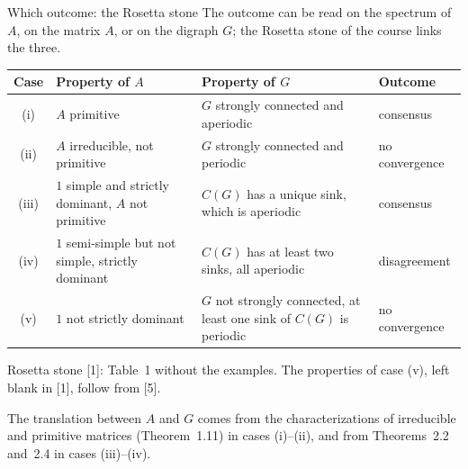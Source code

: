 \documentclass[10pt, aspectratio=169]{beamer}
\begin{document}
\begin{frame}[label=m-fdg-rosetta]{Which outcome: the Rosetta stone}
  \centering
  \footnotesize
  The outcome can be read on the spectrum of $A$, on the matrix $A$, or on the digraph
  $G$; the Rosetta stone of the course links the three.

  \vspace{2mm}
  \renewcommand{\arraystretch}{1.25}
  \begin{tabular}{@{}c >{\raggedright\arraybackslash}p{4.4cm}
                    >{\raggedright\arraybackslash}p{5.2cm} l@{}}
    \toprule
    Case & Property of $A$ & Property of $G$ & Outcome \\
    \midrule
    (i)   & $A$ primitive
          & $G$ strongly connected and aperiodic
          & consensus \\
    (ii)  & $A$ irreducible, not primitive
          & $G$ strongly connected and periodic
          & no convergence \\
    (iii) & $1$ simple and strictly dominant, $A$ not primitive
          & $C(G)$ has a unique sink, which is aperiodic
          & consensus \\
    (iv)  & $1$ semi-simple but not simple, strictly dominant
          & $C(G)$ has at least two sinks, all aperiodic
          & disagreement \\
    (v)   & $1$ not strictly dominant
          & $G$ not strongly connected, at least one sink of $C(G)$ is periodic
          & no convergence \\
    \bottomrule
  \end{tabular}

  \vspace{1mm}
  {\scriptsize Rosetta stone [1]: Table~1 without the examples. The properties of case
  (v), left blank in [1], follow from [5].}

  \vspace{1.5mm}
  \raggedright
  The translation between $A$ and $G$ comes from the characterizations of irreducible and
  primitive matrices (Theorem~1.11) in cases (i)--(ii), and from Theorems~2.2 and~2.4 in
  cases (iii)--(iv).


\end{frame}
\end{document}
